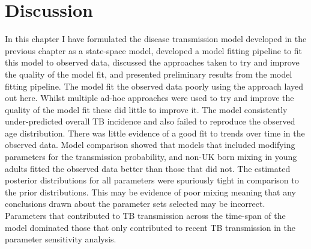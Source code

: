 \documentclass[11pt,twoside]{bristolthesis}
\begin{document}
  \hypertarget{discussion-6}{%
  \section{Discussion}\label{discussion-6}}
  
  In this chapter I have formulated the disease transmission model developed in the previous chapter as a state-space model, developed a model fitting pipeline to fit this model to observed data, discussed the approaches taken to try and improve the quality of the model fit, and presented preliminary results from the model fitting pipeline. The model fit the observed data poorly using the approach layed out here. Whilst multiple ad-hoc approaches were used to try and improve the quality of the model fit these did little to improve it. The model consistently under-predicted overall TB incidence and also failed to reproduce the observed age distribution. There was little evidence of a good fit to trends over time in the observed data. Model comparison showed that models that included modifying parameters for the transmission probability, and non-UK born mixing in young adults fitted the observed data better than those that did not. The estimated posterior distributions for all parameters were spuriously tight in comparison to the prior distributions. This may be evidence of poor mixing meaning that any conclusions drawn about the parameter sets selected may be incorrect. Parameters that contributed to TB transmission across the time-span of the model dominated those that only contributed to recent TB transmission in the parameter sensitivity analysis.
  
\end{document}
